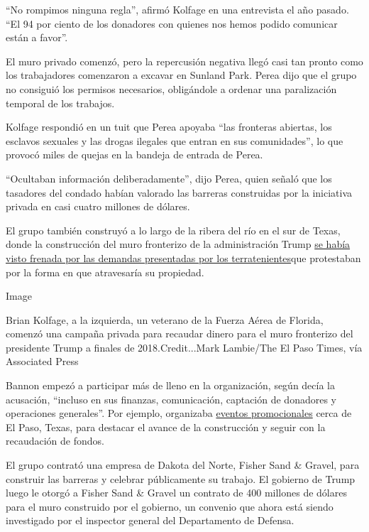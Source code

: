 ``No rompimos ninguna regla'', afirmó Kolfage en una entrevista el año
pasado. ``El 94 por ciento de los donadores con quienes nos hemos podido
comunicar están a favor''.

El muro privado comenzó, pero la repercusión negativa llegó casi tan
pronto como los trabajadores comenzaron a excavar en Sunland Park. Perea
dijo que el grupo no consiguió los permisos necesarios, obligándole a
ordenar una paralización temporal de los trabajos.

Kolfage respondió en un tuit que Perea apoyaba ``las fronteras abiertas,
los esclavos sexuales y las drogas ilegales que entran en sus
comunidades'', lo que provocó miles de quejas en la bandeja de entrada
de Perea.

``Ocultaban información deliberadamente'', dijo Perea, quien señaló que
los tasadores del condado habían valorado las barreras construidas por
la iniciativa privada en casi cuatro millones de dólares.

El grupo también construyó a lo largo de la ribera del río en el sur de
Texas, donde la construcción del muro fronterizo de la administración
Trump
\href{https://www.nytimes3xbfgragh.onion/es/2019/12/27/espanol/muro-fronterizo-trump-texas.html}{se
había visto frenada por las demandas presentadas por los
terratenientes}que protestaban por la forma en que atravesaría su
propiedad.

Image

Brian Kolfage, a la izquierda, un veterano de la Fuerza Aérea de
Florida, comenzó una campaña privada para recaudar dinero para el muro
fronterizo del presidente Trump a finales de 2018.Credit...Mark
Lambie/The El Paso Times, vía Associated Press

Bannon empezó a participar más de lleno en la organización, según decía
la acusación, ``incluso en sus finanzas, comunicación, captación de
donadores y operaciones generales''. Por ejemplo, organizaba
\href{https://www.youtube.com/watch?v=RvhZO5fNr-8}{eventos
promocionales} cerca de El Paso, Texas, para destacar el avance de la
construcción y seguir con la recaudación de fondos.

El grupo contrató una empresa de Dakota del Norte, Fisher Sand \&
Gravel, para construir las barreras y celebrar públicamente su trabajo.
El gobierno de Trump luego le otorgó a Fisher Sand \& Gravel un contrato
de 400 millones de dólares para el muro construido por el gobierno, un
convenio que ahora está siendo investigado por el inspector general del
Departamento de Defensa.

